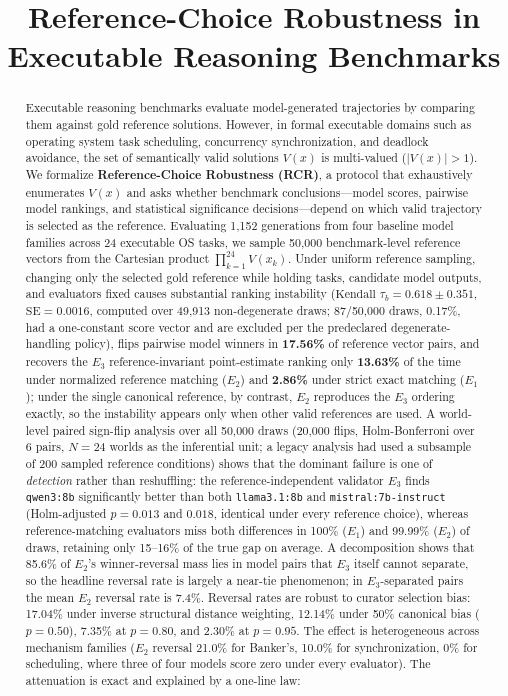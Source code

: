 \documentclass[11pt]{article}
\title{Reference-Choice Robustness in Executable Reasoning Benchmarks}
\author{}
\date{}
\begin{document}
\maketitle
\begin{abstract}
Executable reasoning benchmarks evaluate model-generated trajectories by comparing them against gold reference solutions. However, in formal executable domains such as operating system task scheduling, concurrency synchronization, and deadlock avoidance, the set of semantically valid solutions $V(x)$ is multi-valued ($|V(x)| > 1$). We formalize \textbf{Reference-Choice Robustness (RCR)}, a protocol that exhaustively enumerates $V(x)$ and asks whether benchmark conclusions---model scores, pairwise model rankings, and statistical significance decisions---depend on which valid trajectory is selected as the reference. Evaluating 1,152 generations from four baseline model families across 24 executable OS tasks, we sample 50,000 benchmark-level reference vectors from the Cartesian product $\prod_{k=1}^{24} V(x_k)$. Under uniform reference sampling, changing only the selected gold reference while holding tasks, candidate model outputs, and evaluators fixed causes substantial ranking instability ($\text{Kendall } \tau_b = 0.618 \pm 0.351$, $\text{SE} = 0.0016$, computed over 49,913 non-degenerate draws; 87/50,000 draws, 0.17\%, had a one-constant score vector and are excluded per the predeclared degenerate-handling policy), flips pairwise model winners in \textbf{17.56\%} of reference vector pairs, and recovers the $E_3$ reference-invariant point-estimate ranking only \textbf{13.63\%} of the time under normalized reference matching ($E_2$) and \textbf{2.86\%} under strict exact matching ($E_1$); under the single canonical reference, by contrast, $E_2$ reproduces the $E_3$ ordering exactly, so the instability appears only when other valid references are used. A world-level paired sign-flip analysis over all 50,000 draws (20,000 flips, Holm-Bonferroni over 6 pairs, $N=24$ worlds as the inferential unit; a legacy analysis had used a subsample of 200 sampled reference conditions) shows that the dominant failure is one of \emph{detection} rather than reshuffling: the reference-independent validator $E_3$ finds \texttt{qwen3:8b} significantly better than both \texttt{llama3.1:8b} and \texttt{mistral:7b-instruct} (Holm-adjusted $p = 0.013$ and $0.018$, identical under every reference choice), whereas reference-matching evaluators miss both differences in 100\% ($E_1$) and 99.99\% ($E_2$) of draws, retaining only 15--16\% of the true gap on average. A decomposition shows that 85.6\% of $E_2$'s winner-reversal mass lies in model pairs that $E_3$ itself cannot separate, so the headline reversal rate is largely a near-tie phenomenon; in $E_3$-separated pairs the mean $E_2$ reversal rate is 7.4\%. Reversal rates are robust to curator selection bias: 17.04\% under inverse structural distance weighting, 12.14\% under 50\% canonical bias ($p=0.50$), 7.35\% at $p=0.80$, and 2.30\% at $p=0.95$. The effect is heterogeneous across mechanism families ($E_2$ reversal 21.0\% for Banker's, 10.0\% for synchronization, 0\% for scheduling, where three of four models score zero under every evaluator). The attenuation is exact and explained by a one-line law: 
\end{abstract}
\end{document}
